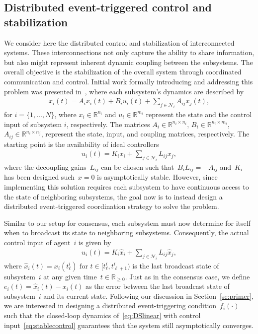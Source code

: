 \documentclass{autart}
\newcommand{\realnonnegative}{\mathbb{R}_{\ge 0}}
\newcommand{\NN}{{\mathcal{N}}}
\newcommand{\until}[1]{\{1,\dots, #1\}}
\renewcommand{\hat}{\widehat}
\begin{document}
{  \subsection{Distributed event-triggered control and stabilization}
  We consider here the distributed control and stabilization of
  interconnected systems.  These interconnections not only capture the
  ability to share information, but also might represent inherent
  dynamic coupling between the subsystems. The overall objective is
  the stabilization of the overall system through coordinated
  communication and control. Initial work formally introducing and
  addressing this problem was presented
  in~\citep{XW-MDL:08,XW-MDL:08b}, where each subsystem's dynamics are
  described by
  \begin{align}
    \dot{x}_i (t)= A_ix_i(t) + B_iu_i(t) + \sum_{j\in\mathcal{N}_i}
    A_{ij}x_j(t) , \label{eq:DSlinear}
  \end{align}
  for $i = \until{N}$, where $x_i\in \mathbb{R}^{n_i}$ and $u_i\in
  \mathbb{R}^{m_i}$ represent the state and the control input of
  subsystem $i$, respectively. The matrices $A_i\in \mathbb{R}^{n_i
    \times n_i}$, $B_i\in \mathbb{R}^{n_i \times m_i}$, $A_{ij}\in
  \mathbb{R}^{n_i \times n_j}$, represent the state, input, and
  coupling matrices, respectively. The starting point is the
  availability of ideal controllers
  \begin{align*}
    u_i(t) = K_i x_i + \sum_{j \in \NN_i} L_{ij} x_j,
  \end{align*}
  where the decoupling gains~$L_{ij}$ can be chosen such that~$B_i
  L_{ij} = -A_{ij}$ and~$K_i$ has been designed such~$x = 0$ is
  asymptotically stable. However, since implementing this solution
  requires each subsystem to have continuous access to the state of
  neighboring subsystems, the goal now is to instead design a
  distributed event-triggered coordination strategy to solve the
  problem.

  Similar to our setup for consensus, each subsystem must now
  determine for itself when to broadcast its state to neighboring
  subsystems. Consequently, the actual control input of agent~$i$ is
  given by
  \begin{align}\label{eq:stablecontrol}
    u_i(t) = K_i \hat{x}_i + \sum_{j \in \NN_i} L_{ij} \hat{x}_j,
  \end{align}
  where $ \hat{x}_i(t) = x_i(t_\ell^i) \text{ for } t \in
  [t_\ell^i,t_{\ell+1}^i)$ is the last broadcast state of
  subsystem~$i$ at any given time~$t \in \realnonnegative$. Just as in
  the consensus case, we define~$e_i(t)=\hat{x}_i(t) - x_i(t)$ as the
  error between the last broadcast state of subsystem~$i$ and its
  current state. Following our discussion in Section~\ref{se:primer},
  we are interested in designing a distributed event-triggering
  condition~$f_i(\cdot)$ such that the closed-loop dynamics
  of~\eqref{eq:DSlinear} with control input~\eqref{eq:stablecontrol}
  guarantees that the system still asymptotically converges.

}
\end{document}
